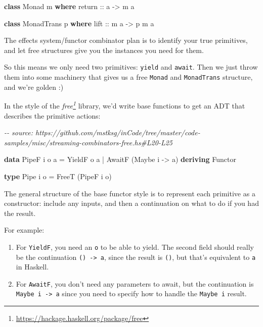 \documentclass[]{article}
\newenvironment{Shaded}{}{}
\newcommand{\CommentTok}[1]{\textcolor[rgb]{0.38,0.63,0.69}{\textit{#1}}}
\newcommand{\DataTypeTok}[1]{\textcolor[rgb]{0.56,0.13,0.00}{#1}}
\newcommand{\KeywordTok}[1]{\textcolor[rgb]{0.00,0.44,0.13}{\textbf{#1}}}
\newcommand{\NormalTok}[1]{#1}
\newcommand{\OperatorTok}[1]{\textcolor[rgb]{0.40,0.40,0.40}{#1}}
\newcommand{\OtherTok}[1]{\textcolor[rgb]{0.00,0.44,0.13}{#1}}
\renewcommand{\href}[2]{#2\footnote{\url{#1}}}
\begin{document}
\begin{Shaded}
\begin{Highlighting}[]
\KeywordTok{class} \DataTypeTok{Monad}\NormalTok{ m }\KeywordTok{where}
\OtherTok{    return ::}\NormalTok{ a }\OtherTok{{-}>}\NormalTok{ m a}

\KeywordTok{class} \DataTypeTok{MonadTrans}\NormalTok{ p }\KeywordTok{where}
\OtherTok{    lift ::}\NormalTok{ m a }\OtherTok{{-}>}\NormalTok{ p m a}
\end{Highlighting}
\end{Shaded}

The effects system/functor combinator plan is to identify your true primitives,
and let free structures give you the instances you need for them.

So this means we only need two primitives: \texttt{yield} and \texttt{await}.
Then we just throw them into some machinery that gives us a free \texttt{Monad}
and \texttt{MonadTrans} structure, and we're golden :)

In the style of the \emph{\href{https://hackage.haskell.org/package/free}{free}}
library, we'd write base functions to get an ADT that describes the primitive
actions:

\begin{Shaded}
\begin{Highlighting}[]
\CommentTok{{-}{-} source: https://github.com/mstksg/inCode/tree/master/code{-}samples/misc/streaming{-}combinators{-}free.hs\#L20{-}L25}

\KeywordTok{data} \DataTypeTok{PipeF}\NormalTok{ i o a }\OtherTok{=}
    \DataTypeTok{YieldF}\NormalTok{ o a}
  \OperatorTok{|} \DataTypeTok{AwaitF}\NormalTok{ (}\DataTypeTok{Maybe}\NormalTok{ i }\OtherTok{{-}>}\NormalTok{ a)}
    \KeywordTok{deriving} \DataTypeTok{Functor}
               
\KeywordTok{type} \DataTypeTok{Pipe}\NormalTok{ i o }\OtherTok{=} \DataTypeTok{FreeT}\NormalTok{ (}\DataTypeTok{PipeF}\NormalTok{ i o)}
\end{Highlighting}
\end{Shaded}

The general structure of the base functor style is to represent each primitive
as a constructor: include any inputs, and then a continuation on what to do if
you had the result.

For example:

\begin{enumerate}
\def\labelenumi{\arabic{enumi}.}
\tightlist
\item
  For \texttt{YieldF}, you need an \texttt{o} to be able to yield. The second
  field should really be the continuation \texttt{()\ -\textgreater{}\ a}, since
  the result is \texttt{()}, but that's equivalent to \texttt{a} in Haskell.
\item
  For \texttt{AwaitF}, you don't need any parameters to await, but the
  continuation is \texttt{Maybe\ i\ -\textgreater{}\ a} since you need to
  specify how to handle the \texttt{Maybe\ i} result.
\end{enumerate}
\end{document}
